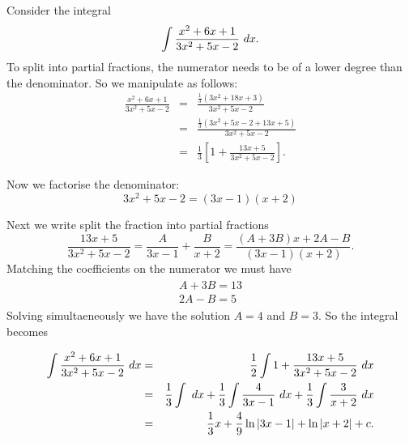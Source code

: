 \begin{example}
Consider the integral
\[\int \frac{x^2+6x+1}{3x^2+5x-2}\ dx.\]
To split into partial fractions, the numerator needs to be of a lower degree than the denominator. So we manipulate as follows:
\begin{eqnarray*}
\frac{x^2+6x+1}{3x^2+5x-2}&=&\frac{\frac{1}{3}(3x^2+18x+3)}{3x^2+5x-2} \\
&=&\frac{\frac{1}{3}(3x^2+5x-2+13x+5)}{3x^2+5x-2} \\
&=&\frac{1}{3}\left[1+\frac{13x+5}{3x^2+5x-2}\right].
\end{eqnarray*}

Now we factorise the denominator:\[3x^2+5x-2=(3x-1)(x+2)\] 

Next we write split the fraction into partial fractions
\[\frac{13x+5}{3x^2+5x-2}=\frac{A}{3x-1}+\frac{B}{x+2}=\frac{(A+3B)x+2A-B}{(3x-1)(x+2)}.\]
Matching the coefficients on the numerator we must have
\begin{align*}
    \left. \begin{array}{l}
        A+3B=13  \\
        2A-B=5 
    \end{array}\right.
\end{align*}
Solving simultaeneously we have the solution $A=4$ and $B=3$. So the integral becomes

\begin{eqnarray*}
\int \frac{x^2+6x+1}{3x^2+5x-2}\ dx &=& \frac{1}{2}\int 1+\frac{13x+5}{3x^2+5x-2}\ dx\\
&=& \frac{1}{3}\int\ dx+\frac{1}{3}\int\frac{4}{3x-1}\ dx+\frac{1}{3}\int\frac{3}{x+2}\ dx \\
&=& \frac{1}{3}x+\frac{4}{9}\ln|3x-1|+\ln|x+2|+c.
\end{eqnarray*}
\end{example}
